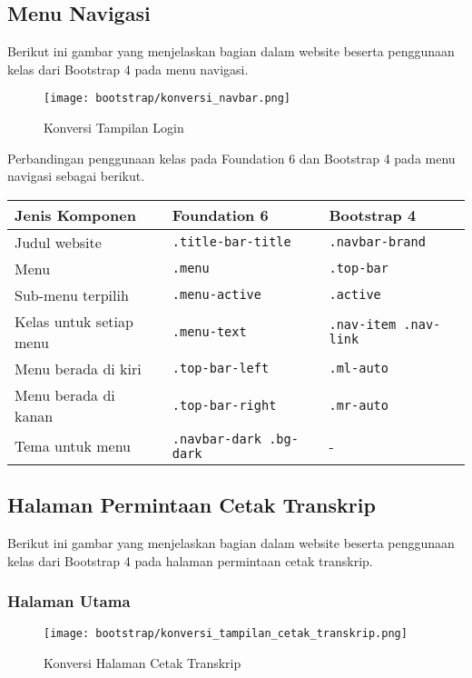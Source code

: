 \subsection{Menu Navigasi}
\noindent Berikut ini gambar yang menjelaskan bagian dalam website beserta penggunaan kelas dari Bootstrap 4 pada menu navigasi.\\
\begin{figure} [H]
	\centering  
	\texttt{[image: bootstrap/konversi\_navbar.png]}  
	\caption{Konversi Tampilan Login} 
\end{figure}

\noindent Perbandingan penggunaan kelas pada Foundation 6 dan Bootstrap 4 pada menu navigasi sebagai berikut.\\
\begin{tabular}{| p{} | p{} | p{} |} 
	\hline
	\textbf{Jenis Komponen} & \textbf{Foundation 6} & \textbf{Bootstrap 4}  \\ [0.5ex] 
	\hline	
	 Judul website & \texttt{.title-bar-title }& \texttt{.navbar-brand}  \\ 
	\hline
	Menu &\texttt{.menu }& \texttt{.top-bar } \\
	\hline
	Sub-menu terpilih & \texttt{.menu-active} & \texttt{.active}  \\
	\hline	
	Kelas untuk setiap menu & \texttt{.menu-text} & \texttt{.nav-item .nav-link} \\
	\hline	
	Menu berada di kiri & \texttt{.top-bar-left} & \texttt{.ml-auto}  \\
	\hline
	Menu berada di kanan & \texttt{.top-bar-right} & \texttt{.mr-auto}  \\
	\hline
	Tema untuk menu & \texttt{.navbar-dark .bg-dark} & -  \\ [1ex] 
	\hline
\end{tabular}

\subsection{Halaman Permintaan Cetak Transkrip}
\noindent Berikut ini gambar yang menjelaskan bagian dalam website beserta penggunaan kelas dari Bootstrap 4 pada halaman permintaan cetak transkrip.\\

\subsubsection{Halaman Utama}
\begin{figure} [H]
	\centering  
	\texttt{[image: bootstrap/konversi\_tampilan\_cetak\_transkrip.png]}
	\caption{Konversi Halaman Cetak Transkrip} 
\end{figure}

